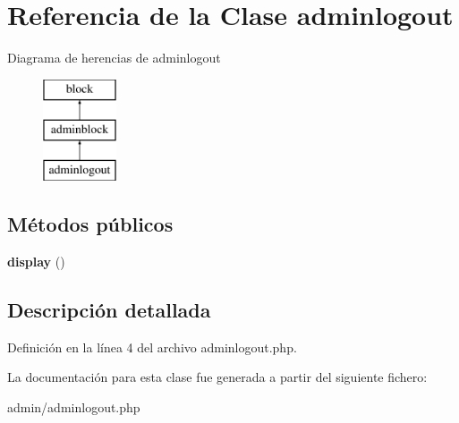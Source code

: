 \hypertarget{classadminlogout}{\section{\-Referencia de la \-Clase adminlogout}
\label{classadminlogout}
}
\-Diagrama de herencias de adminlogout\begin{figure}[H]
\begin{center}
\leavevmode
\includegraphics[height=3.000000cm]{classadminlogout}
\end{center}
\end{figure}
\subsection*{\-Métodos públicos}
\begin{DoxyCompactItemize}
\item 
\hypertarget{classadminlogout_a75f9b062b4c8cd673c544a0c2ce62034}{{\bfseries display} ()}\label{classadminlogout_a75f9b062b4c8cd673c544a0c2ce62034}

\end{DoxyCompactItemize}


\subsection{\-Descripción detallada}


\-Definición en la línea 4 del archivo adminlogout.\-php.



\-La documentación para esta clase fue generada a partir del siguiente fichero\-:\begin{DoxyCompactItemize}
\item 
admin/adminlogout.\-php\end{DoxyCompactItemize}
